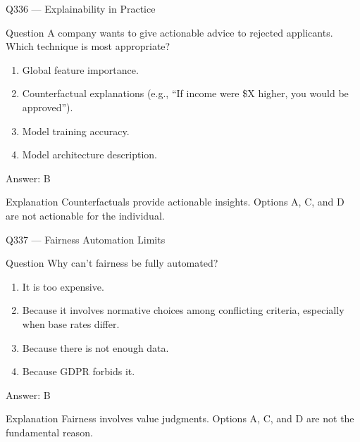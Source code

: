 \documentclass[aspectratio=169,8pt]{beamer}
\begin{document}
\begin{frame}{Q336 --- Explainability in Practice}
	\begin{block}{Question}
		A company wants to give actionable advice to rejected applicants. Which technique is most appropriate?
		\begin{enumerate}
			\item Global feature importance.
			\item Counterfactual explanations (e.g., ``If income were \$X higher, you would be approved'').
			\item Model training accuracy.
			\item Model architecture description.
	\end{enumerate}  \end{block}
	\begin{exampleblock}{Answer: B}\end{exampleblock}
	\begin{block}{Explanation}
		Counterfactuals provide actionable insights. Options A, C, and D are not actionable for the individual.
	\end{block}
\end{frame}

\begin{frame}{Q337 --- Fairness Automation Limits}
	\begin{block}{Question}
		Why can't fairness be fully automated?
		\begin{enumerate}
			\item It is too expensive.
			\item Because it involves normative choices among conflicting criteria, especially when base rates differ.
			\item Because there is not enough data.
			\item Because GDPR forbids it.
	\end{enumerate}  \end{block}
	\begin{exampleblock}{Answer: B}\end{exampleblock}
	\begin{block}{Explanation}
		Fairness involves value judgments. Options A, C, and D are not the fundamental reason.
	\end{block}
\end{frame}
\end{document}
